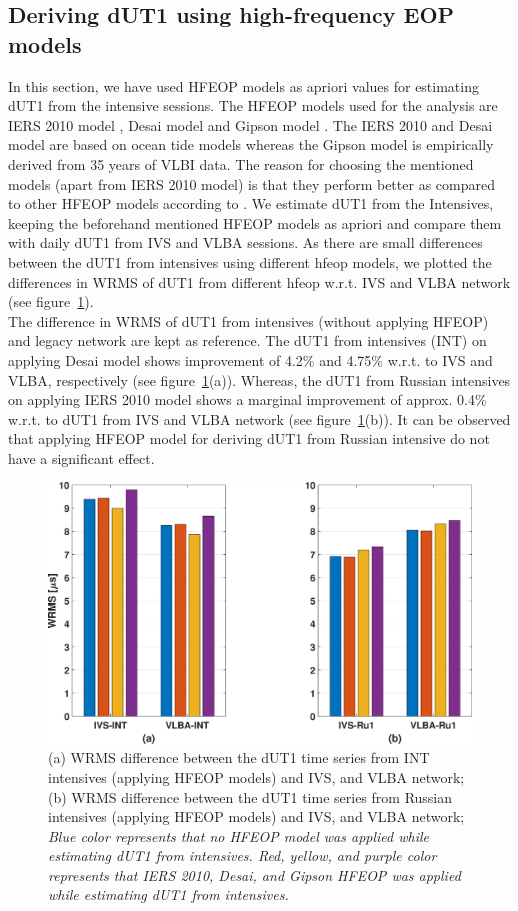 \documentclass[smallextended]{svjour3}       %
\begin{document}
\subsection{Deriving dUT1 using high-frequency EOP models}
In this section, we have used HFEOP models as apriori values for estimating dUT1 from the intensive sessions. The HFEOP models used for the analysis are IERS 2010 model \citep{petit2010iers}, Desai model \citep{desai2016evaluating} and Gipson model \citep{gipson2015new}. The IERS 2010 and Desai model are based on ocean tide models whereas the Gipson model is empirically derived from 35 years of VLBI data. The reason for choosing the mentioned models (apart from IERS 2010 model) is that they perform better as compared to other HFEOP models according to \cite{nilsson2018evaluation}. We estimate dUT1 from the Intensives, keeping the beforehand mentioned HFEOP models as apriori and compare them with daily dUT1 from IVS and VLBA sessions. As there are small differences between the dUT1 from intensives using different hfeop models, we plotted the differences in WRMS of dUT1 from different hfeop w.r.t. IVS and VLBA network (see figure~\ref{fig:hfeopdut1}). \\
The difference in WRMS of dUT1 from intensives (without applying HFEOP) and legacy network are kept as reference. The dUT1 from intensives (INT) on applying Desai model shows improvement of 4.2$\%$ and 4.75$\%$ w.r.t. to IVS and VLBA, respectively (see figure~\ref{fig:hfeopdut1}(a)). Whereas, the dUT1 from Russian intensives on applying IERS 2010 model shows a marginal improvement of approx. 0.4$\%$ w.r.t. to dUT1 from IVS and VLBA network (see figure~\ref{fig:hfeopdut1}(b)). It can be observed that applying HFEOP model for deriving dUT1 from Russian intensive do not have a significant effect.
\begin{figure}[h]
    \centering
    \includegraphics[scale=0.3]{wrmsdut1hfeop.eps}
    \caption{(a) WRMS difference between the dUT1 time series from INT intensives (applying HFEOP models) and IVS, and VLBA network; (b) WRMS difference between the dUT1 time series from Russian intensives (applying HFEOP models) and IVS, and VLBA network; \textit{Blue color represents that no HFEOP model was applied while estimating dUT1 from intensives. Red, yellow, and purple color represents that IERS 2010, Desai, and Gipson HFEOP was applied while estimating dUT1 from intensives.}}
    \label{fig:hfeopdut1}
\end{figure}
\end{document}
